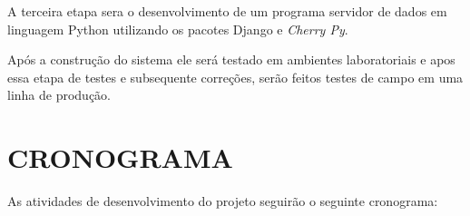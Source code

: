 \documentclass[
	12pt,				%
	openright,			%
	oneside,			%
	a4paper,			%
	chapter=TITLE,		%
	english,			%
	french,				%
	spanish,			%
	brazil,				%
	article,			%
	]{uea-abntex2}
\begin{document}
A terceira etapa sera o desenvolvimento de um programa servidor de dados em linguagem Python utilizando os pacotes Django\cite{django} e \textit{Cherry Py}\cite{cherrypy}.

Após a construção do sistema ele será testado em ambientes laboratoriais e apos essa etapa de testes e subsequente correções, serão feitos testes de campo em uma linha de produção.


\newpage

\section{CRONOGRAMA}

As atividades de desenvolvimento do projeto seguirão o seguinte cronograma:
\newpage

\begin{landscape}



\end{landscape}

\newpage
\vspace*{2.3cm}
\renewcommand{\bibname}{REFERÊNCIAS}



%
%





\end{document}
